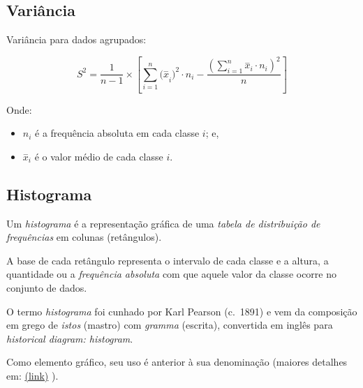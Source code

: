 \documentclass[
]{book}
\providecommand{\tightlist}{%
  \setlength{\itemsep}{0pt}\setlength{\parskip}{0pt}}
\begin{document}
\hypertarget{variuxe2ncia}{%
\subsection{Variância}\label{variuxe2ncia}}

\hfill\break

Variância para dados agrupados:

\[
S^{2}= \frac{1}{n-1} \times \left[  \sum _{i=1}^{n}{(\stackrel{-}{x}}_{i})^{2} \cdot {n}_{i} - \frac{{\left(\sum _{i=1}^{n}{\stackrel{-}{x}}_{i} \cdot {n}_{i}\right)}^{2}  }{n}\right]
\]

Onde:

\begin{itemize}
\tightlist
\item
  \(n_{i}\) é a frequência absoluta em cada classe \(i\); e,
\item
  \(\stackrel{-}{x}_{i}\) é o valor médio de cada classe \(i\).
\end{itemize}

\hypertarget{histograma}{%
\subsection{Histograma}\label{histograma}}

Um \emph{histograma} é a representação gráfica de uma \emph{tabela de distribuição de frequências} em colunas (retângulos).

A base de cada retângulo representa o intervalo de cada classe e a altura, a quantidade ou a \emph{frequência absoluta} com que aquele valor da classe ocorre no conjunto de dados.

O termo \emph{histograma} foi cunhado por Karl Pearson (c.~1891) e vem da composição em grego de \emph{istos} (mastro) com \emph{gramma} (escrita), convertida em inglês para \emph{historical diagram: histogram}.

Como elemento gráfico, seu uso é anterior à sua denominação (maiores detalhes em:
\href{https://www.ine.es/ss/Satellite?blobcol=urldata\&blobheader=application\%2Fpdf\&blobheadername1=Content-Disposition\&blobheadervalue1=attachment\%3B+filename\%3Dart_192_2.pdf\&blobkey=urldata\&blobtable=MungoBlobs\&blobwhere=229\%2F670\%2Fart_192_2.pdf\&ssbinary=true}{(link)} ).
\end{document}
